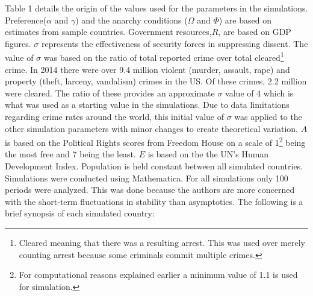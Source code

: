 \documentclass[12pt]{article}
\begin{document}
\begin{spacing}{1.5}
Table 1 details the origin of the values used for the parameters in the simulations. Preference($\alpha$ and $\gamma$) and the anarchy conditions ($\Omega$ and $\Phi$) are based on estimates from sample countries. Government resources,$R$, are based on GDP figures. $\sigma$ represents the effectiveness of security forces in suppressing dissent. The value of $\sigma$ was based on the ratio of total reported crime over total cleared\footnote{Cleared meaning that there was a resulting arrest. This was used over merely counting arrest because some criminals commit multiple crimes.} crime. In 2014 there were over 9.4 million violent (murder, assault, rape) and property (theft, larceny, vandalism) crimes in the US. Of these crimes, 2.2 million were cleared. The ratio of these provides an approximate $\sigma$ value of 4 which is what was used as a starting value in the simulations. Due to data limitations regarding crime rates around the world, this initial value of $\sigma$ was applied to the other simulation parameters with minor changes to create theoretical variation. $A$ is based on the Political Rights scores from Freedom House on a scale of 1\footnote{For computational reasons explained earlier a minimum value of 1.1 is used for simulation.} being the most free and 7 being the least. $E$ is based on the the UN's Human Development Index. Population is held constant between all simulated countries. Simulations were conducted using Mathematica. For all simulations only 100 periods were analyzed. This was done because the authors are more concerned with the short-term fluctuations in stability than asymptotics. The following is a brief synopsis of each simulated country:  



\end{spacing}
\end{document}
